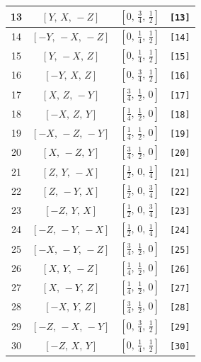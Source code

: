 \documentclass[fleqn,8pt]{jsarticle}
\begin{document}
\begin{longtable}{cccc}
13 & $\left[ Y,\, X,\, - Z \right]$ & $\left[ 0,\, \frac{3}{4},\, \frac{1}{2} \right]$ & {\tt [13]} \\ \hline
14 & $\left[ - Y,\, - X,\, - Z \right]$ & $\left[ 0,\, \frac{1}{4},\, \frac{1}{2} \right]$ & {\tt [14]} \\ \hline
15 & $\left[ Y,\, - X,\, Z \right]$ & $\left[ 0,\, \frac{1}{4},\, \frac{1}{2} \right]$ & {\tt [15]} \\ \hline
16 & $\left[ - Y,\, X,\, Z \right]$ & $\left[ 0,\, \frac{3}{4},\, \frac{1}{2} \right]$ & {\tt [16]} \\ \hline
17 & $\left[ X,\, Z,\, - Y \right]$ & $\left[ \frac{3}{4},\, \frac{1}{2},\, 0 \right]$ & {\tt [17]} \\ \hline
18 & $\left[ - X,\, Z,\, Y \right]$ & $\left[ \frac{1}{4},\, \frac{1}{2},\, 0 \right]$ & {\tt [18]} \\ \hline
19 & $\left[ - X,\, - Z,\, - Y \right]$ & $\left[ \frac{1}{4},\, \frac{1}{2},\, 0 \right]$ & {\tt [19]} \\ \hline
20 & $\left[ X,\, - Z,\, Y \right]$ & $\left[ \frac{3}{4},\, \frac{1}{2},\, 0 \right]$ & {\tt [20]} \\ \hline
21 & $\left[ Z,\, Y,\, - X \right]$ & $\left[ \frac{1}{2},\, 0,\, \frac{1}{4} \right]$ & {\tt [21]} \\ \hline
22 & $\left[ Z,\, - Y,\, X \right]$ & $\left[ \frac{1}{2},\, 0,\, \frac{3}{4} \right]$ & {\tt [22]} \\ \hline
23 & $\left[ - Z,\, Y,\, X \right]$ & $\left[ \frac{1}{2},\, 0,\, \frac{3}{4} \right]$ & {\tt [23]} \\ \hline
24 & $\left[ - Z,\, - Y,\, - X \right]$ & $\left[ \frac{1}{2},\, 0,\, \frac{1}{4} \right]$ & {\tt [24]} \\ \hline
25 & $\left[ - X,\, - Y,\, - Z \right]$ & $\left[ \frac{3}{4},\, \frac{1}{2},\, 0 \right]$ & {\tt [25]} \\ \hline
26 & $\left[ X,\, Y,\, - Z \right]$ & $\left[ \frac{1}{4},\, \frac{1}{2},\, 0 \right]$ & {\tt [26]} \\ \hline
27 & $\left[ X,\, - Y,\, Z \right]$ & $\left[ \frac{1}{4},\, \frac{1}{2},\, 0 \right]$ & {\tt [27]} \\ \hline
28 & $\left[ - X,\, Y,\, Z \right]$ & $\left[ \frac{3}{4},\, \frac{1}{2},\, 0 \right]$ & {\tt [28]} \\ \hline
29 & $\left[ - Z,\, - X,\, - Y \right]$ & $\left[ 0,\, \frac{3}{4},\, \frac{1}{2} \right]$ & {\tt [29]} \\ \hline
30 & $\left[ - Z,\, X,\, Y \right]$ & $\left[ 0,\, \frac{1}{4},\, \frac{1}{2} \right]$ & {\tt [30]} \\ \hline

\end{longtable}
\end{document}
